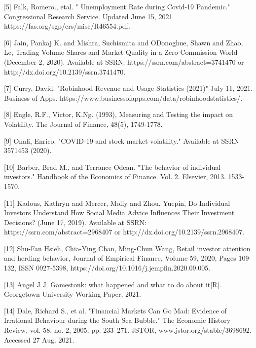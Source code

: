 {[}5{]} Falk, Romero., etal. " Unemployment Rate during Covid-19 Pandemic." Congressional Research Service. Updated June 15, 2021 https://fas.org/sgp/crs/misc/R46554.pdf.

{[}6{]} Jain, Pankaj K. and Mishra, Suchismita and O\textquotesingle Donoghue, Shawn and Zhao, Le, Trading Volume Shares and Market Quality in a Zero Commission World (December 2, 2020). Available at SSRN: https://ssrn.com/abstract=3741470 or http://dx.doi.org/10.2139/ssrn.3741470.

{[}7{]} Curry, David. "Robinhood Revenue and Usage Statistics (2021)" July 11, 2021. Business of Apps. https://www.businessofapps.com/data/robinhoodstatistics/.

{[}8{]} Engle, R.F., Victor, K.Ng. (1993), Measuring and Testing the impact on Volatility. The Journal of Finance, 48(5), 1749-1778.

{[}9{]} Onali, Enrico. "COVID-19 and stock market volatility." Available at SSRN 3571453 (2020).

{[}10{]} Barber, Brad M., and Terrance Odean. "The behavior of individual investors." Handbook of the Economics of Finance. Vol. 2. Elsevier, 2013. 1533-1570.

{[}11{]} Kadous, Kathryn and Mercer, Molly and Zhou, Yuepin, Do Individual Investors Understand How Social Media Advice Influences Their Investment Decisions? (June 17, 2019). Available at SSRN: https://ssrn.com/abstract=2968407 or http://dx.doi.org/10.2139/ssrn.2968407.

{[}12{]} Shu-Fan Hsieh, Chia-Ying Chan, Ming-Chun Wang, Retail investor attention and herding behavior, Journal of Empirical Finance, Volume 59, 2020, Pages 109-132, ISSN 0927-5398, https://doi.org/10.1016/j.jempfin.2020.09.005.

{[}13{]} Angel J J. Gamestonk: what happened and what to do about it{[}R{]}. Georgetown University Working Paper, 2021.

{[}14{]} Dale, Richard S., et al. "Financial Markets Can Go Mad: Evidence of Irrational Behaviour during the South Sea Bubble." The Economic History Review, vol. 58, no. 2, 2005, pp. 233--271. JSTOR, www.jstor.org/stable/3698692. Accessed 27 Aug. 2021.
